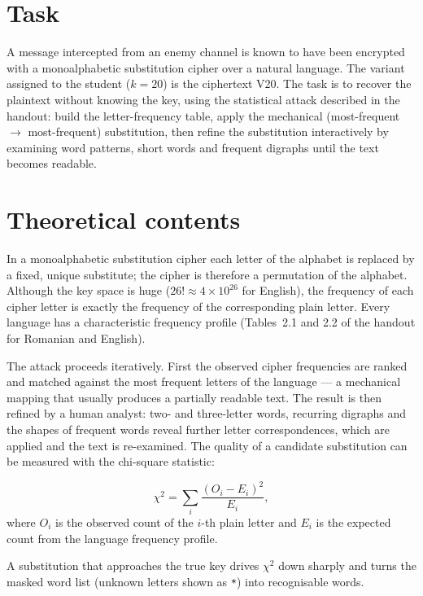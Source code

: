 \documentclass[12pt,a4paper]{article}
\begin{document}
\section{Task}

A message intercepted from an enemy channel is known to have been encrypted with a monoalphabetic substitution cipher over a natural language. The variant assigned to the student ($k=20$) is the ciphertext V20. The task is to recover the plaintext without knowing the key, using the statistical attack described in the handout: build the letter-frequency table, apply the mechanical (most-frequent $\rightarrow$ most-frequent) substitution, then refine the substitution interactively by examining word patterns, short words and frequent digraphs until the text becomes readable.

\section{Theoretical contents}

In a monoalphabetic substitution cipher each letter of the alphabet is replaced by a fixed, unique substitute; the cipher is therefore a permutation of the alphabet. Although the key space is huge ($26!\approx4\times10^{26}$ for English), the frequency of each cipher letter is exactly the frequency of the corresponding plain letter. Every language has a characteristic frequency profile (Tables~2.1 and 2.2 of the handout for Romanian and English).

The attack proceeds iteratively. First the observed cipher frequencies are ranked and matched against the most frequent letters of the language --- a mechanical mapping that usually produces a partially readable text. The result is then refined by a human analyst: two- and three-letter words, recurring digraphs and the shapes of frequent words reveal further letter correspondences, which are applied and the text is re-examined. The quality of a candidate substitution can be measured with the chi-square statistic:

\begin{equation}
  \chi^2=\sum_i\frac{(O_i-E_i)^2}{E_i},
\end{equation}
where $O_i$ is the observed count of the $i$-th plain letter and $E_i$ is the expected count from the language frequency profile.

A substitution that approaches the true key drives $\chi^2$ down sharply and turns the masked word list (unknown letters shown as \texttt{*}) into recognisable words.
\end{document}
